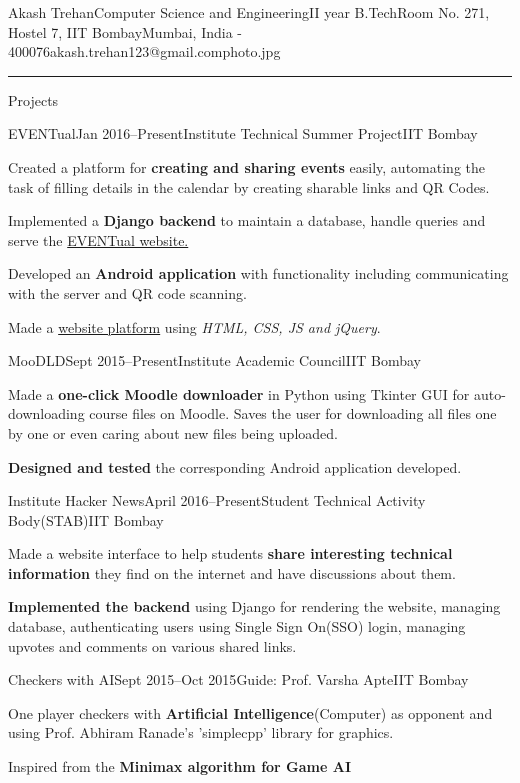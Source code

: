 \documentclass{resume_ssl}
\begin{document}
\begin{Header}{Akash Trehan}{Computer Science and Engineering}{II year B.Tech}{Room No. 271, Hostel 7, IIT Bombay}{Mumbai, India - 400076}{akash.trehan123@gmail.com}{photo.jpg}
\end{Header}

\rule{\textwidth}{1pt}

\begin{Section}{Projects}
\begin{Subsection}{EVENTual}{Jan 2016--Present}{Institute Technical Summer Project}{IIT Bombay}
\item {Created a platform for \textbf{creating and sharing events} easily, automating the task of filling details in the calendar by creating sharable links and QR Codes.}
\item {Implemented a \textbf{Django backend} to maintain a database, handle queries and serve the
\href{http://www.eventual.co.in}{EVENTual website.}}
\item {Developed an \textbf{Android application} with functionality including communicating with the server and QR code scanning.}
\item {Made a \href{http://www.eventual.co.in}{website platform} using \textit{HTML, CSS, JS and jQuery}.}
\end{Subsection}

\begin{Subsection}{MooDLD}{Sept 2015--Present}{Institute Academic Council}{IIT Bombay}
\item {Made a \textbf{one-click Moodle downloader} in Python using Tkinter GUI for auto-downloading course files on Moodle. Saves the user for downloading all files one by one or even caring about new files being uploaded.}
\item {\textbf{Designed and tested} the corresponding Android application developed.}
\end{Subsection}

\begin{Subsection}{Institute Hacker News}{April 2016--Present}{Student Technical Activity Body(STAB)}{IIT Bombay}
\item {Made a website interface to help students \textbf{share interesting technical information} they find on the internet and have discussions about them.}
\item {\textbf{Implemented the backend} using Django for rendering the website, managing database, authenticating users using Single Sign On(SSO) login, managing upvotes and comments on various shared links.}
\end{Subsection}

\begin{Subsection}{Checkers with AI}{Sept 2015--Oct 2015}{Guide: Prof. Varsha Apte}{IIT Bombay}
\item {One player checkers with \textbf{Artificial Intelligence}(Computer) as opponent and using Prof. Abhiram Ranade's 'simplecpp' library for graphics.}
\item {Inspired from the \textbf{Minimax algorithm for Game AI}}
\end{Subsection}

\end{Section}
\end{document}
